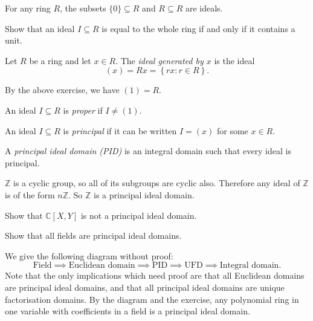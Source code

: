 \documentclass[a4paper,11pt]{article}
\begin{document}
    \begin{example}
      For any ring \(R\), the subsets \(\{0\} \subseteq R\) and \(R \subseteq R\) are ideals.
    \end{example}

    \begin{exercise}
      Show that an ideal \(I \subseteq R\) is equal to the whole ring if and only if it contains a unit.
    \end{exercise}

    \begin{example}
      Let \(R\) be a ring and let \(x \in R\). The \emph{ideal generated by \(x\)} is the ideal
      \[
        (x) = Rx = \left\{ rx : r \in R \right\}.
      \]
    \end{example}

    By the above exercise, we have \((1) = R\).

    \begin{definition}
      An ideal \(I \subseteq R\) is \emph{proper} if \(I \ne (1)\).
    \end{definition}

    \begin{definition}
      An ideal \(I \subseteq R\) is \emph{principal} if it can be written \(I = (x)\) for some \(x \in R\).
    \end{definition}

    \begin{definition}
      A \emph{principal ideal domain (PID)} is an integral domain such that every ideal is principal.
    \end{definition}

    \begin{example}
      \(\mathbb{Z}\) is a cyclic group, so all of its subgroups are cyclic also. Therefore any ideal of \(\mathbb{Z}\) is of the form \(n \mathbb{Z}\). So \(\mathbb{Z}\) is a principal ideal domain.
    \end{example}

    \begin{exercise}
      Show that \(\mathbb{C}[X,Y]\) is not a principal ideal domain.
    \end{exercise}

    \begin{exercise}
      Show that all fields are principal ideal domains.
    \end{exercise}

    We give the following diagram without proof:
    \[
      \text{Field} \implies \text{Euclidean domain} \implies \text{PID} \implies \text{UFD} \implies \text{Integral domain}.
    \]
    Note that the only implications which need proof are that all Euclidean domains are principal ideal domains, and that all principal ideal domains are unique factorisation domains. By the diagram and the exercise, any polynomial ring in one variable with coefficients in a field is a principal ideal domain.
\end{document}
